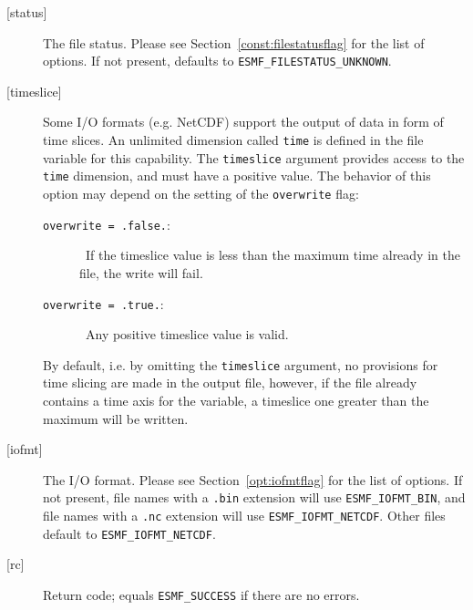 \begin{description}
\begin{sloppypar}
      \end{sloppypar}
     \item[{[status]}]
      \begin{sloppypar}
      The file status. Please see Section~\ref{const:filestatusflag} for
      the list of options. If not present, defaults to
      {\tt ESMF\_FILESTATUS\_UNKNOWN}.
      \end{sloppypar}
     \item[{[timeslice]}]
      \begin{sloppypar}
      Some I/O formats (e.g. NetCDF) support the output of data in form of
      time slices.  An unlimited dimension called {\tt time} is defined in the
      file variable for this capability.
      The {\tt timeslice} argument provides access to the {\tt time} dimension,
      and must have a positive value. The behavior of this
      option may depend on the setting of the {\tt overwrite} flag:
      \begin{description}
      \item[{\tt overwrite = .false.}:]\ If the timeslice value is
      less than the maximum time already in the file, the write will fail.
      \item[{\tt overwrite = .true.}:]\ Any positive timeslice value is valid.
      \end{description}
      By default, i.e. by omitting the {\tt timeslice} argument, no
      provisions for time slicing are made in the output file,
      however, if the file already contains a time axis for the variable,
      a timeslice one greater than the maximum will be written.
      \end{sloppypar}
     \item[{[iofmt]}]
      \begin{sloppypar}
      The I/O format.  Please see Section~\ref{opt:iofmtflag} for the list
      of options. If not present, file names with a {\tt .bin} extension will
      use {\tt ESMF\_IOFMT\_BIN}, and file names with a {\tt .nc} extension
      will use {\tt ESMF\_IOFMT\_NETCDF}.  Other files default to
      {\tt ESMF\_IOFMT\_NETCDF}.
      \end{sloppypar}
     \item[{[rc]}]
      Return code; equals {\tt ESMF\_SUCCESS} if there are no errors.
    \end{description}
  
\setlength{\parskip}{\oldparskip}
\setlength{\parindent}{\oldparindent}
\setlength{\baselineskip}{\oldbaselineskip}
